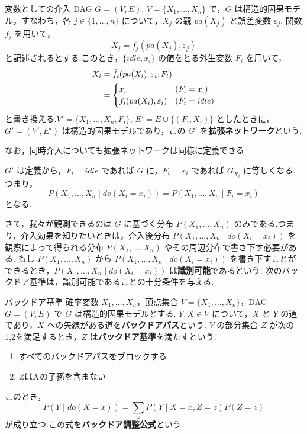 \documentclass[uplatex, dvipdfmx]{jsarticle}
\begin{document}
\begin{defn}{変数としての介入}
  DAG $G=(V,E)$, $V=\{X_1, \dots, X_n\}$ で，$G$ は構造的因果モデル，すなわち，各 $j \in \{1, \dots, n\}$ について，$X_j$ の親 $pa(X_j)$ と誤差変数 $\varepsilon_j$, 関数 $f_j$ を用いて，
  \begin{equation}
    X_j = f_j(pa(X_j), \varepsilon_j)
  \end{equation}
  と記述されるとする.このとき，$\{idle, x_i\}$ の値をとる外生変数 $F_i$ を用いて，
  \begin{align}
    X_i &= \hat{f}_i(pa(X_i), \varepsilon_i, F_i) \notag \\
    &= \begin{cases} 
      x_i & (F_i = x_i) \\ 
      f_i(pa(X_i), \varepsilon_i) & (F_i = idle) 
    \end{cases}
  \end{align}
  と書き換える.$V' = \{X_1, \dots, X_n, F_i\}$, $E' = E \cup \{(F_i, X_i)\}$ としたときに，$G' = (V', E')$ は構造的因果モデルであり，この $G'$ を\textbf{拡張ネットワーク}という.
\end{defn}

なお，同時介入についても拡張ネットワークは同様に定義できる.

$G'$ は定義から，$F_i = idle$ であれば $G$ に，$F_i = x_i$ であれば $G_{\overline{X_i}}$ に等しくなる.つまり，
\begin{equation}
  P(X_1, \dots, X_n \mid do(X_i = x_i)) = P(X_1, \dots, X_n \mid F_i = x_i)
\end{equation}
となる.

さて，我々が観測できるのは $G$ に基づく分布 $P(X_1, \dots, X_n)$ のみである.つまり，介入効果を知りたいときは，介入後分布 $P(X_1, \dots, X_n \mid do(X_i = x_i))$ を観察によって得られる分布 $P(X_1, \dots, X_n)$ やその周辺分布で書き下す必要がある.
もし $P(X_1, \dots, X_n)$ から $P(X_1, \dots, X_n \mid do(X_i = x_i))$ を書き下すことができるとき，$P(X_1, \dots, X_n \mid do(X_i = x_i))$ は\textbf{識別可能}であるという.
次のバックドア基準は，識別可能であることの十分条件を与える.

\begin{prop}{バックドア基準}
  確率変数 $X_1, \dots, X_n$，頂点集合 $V = \{X_1, \dots, X_n\}$，DAG $G = (V, E)$ で $G$ は構造的因果モデルとする.
  $Y, X \in V$ について，$X$ と $Y$ の道であり，$X$ への矢線がある道を\textbf{バックドアパス}という.
  $V$ の部分集合 $Z$ が次の1,2を満足するとき，$Z$ は\textbf{バックドア基準}を満たすという.

  \begin{enumerate}
  \item すべてのバックドアパスをブロックする
  \item $Z$は$X$の子孫を含まない
  \end{enumerate}
  このとき，
  \begin{equation}
    P(Y \mid do(X=x)) = \sum_z P(Y \mid X=x, Z=z) P(Z=z)
  \end{equation}
  が成り立つ.この式を\textbf{バックドア調整公式}という.
\end{prop}
\end{document}
